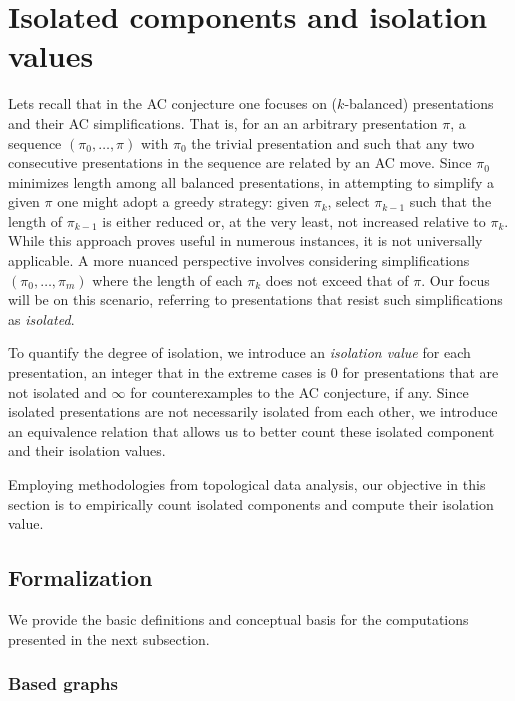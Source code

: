 
\section{Isolated components and isolation values}\label{s:isolation}

Lets recall that in the AC conjecture one focuses on ($k$-balanced) presentations and their AC simplifications.
That is, for an an arbitrary presentation $\pi$, a sequence $(\pi_0,\dots,\pi)$ with $\pi_0$ the trivial presentation and such that any two consecutive presentations in the sequence are related by an AC move.
Since $\pi_0$ minimizes length among all balanced presentations, in attempting to simplify a given $\pi$ one might adopt a greedy strategy: given $\pi_k$, select $\pi_{k-1}$ such that the length of $\pi_{k-1}$ is either reduced or, at the very least, not increased relative to $\pi_k$.
While this approach proves useful in numerous instances, it is not universally applicable.
A more nuanced perspective involves considering simplifications $(\pi_0,\dots,\pi_m)$ where the length of each $\pi_k$ does not exceed that of $\pi$.
Our focus will be on this scenario, referring to presentations that resist such simplifications as \textit{isolated}.

To quantify the degree of isolation, we introduce an \textit{isolation value} for each presentation,
an integer that in the extreme cases is $0$ for presentations that are not isolated and $\infty$ for counterexamples to the AC conjecture, if any.
Since isolated presentations are not necessarily isolated from each other, we introduce an equivalence relation that allows us to better count these isolated component and their isolation values.

Employing methodologies from topological data analysis, our objective in this section is to empirically count isolated components and compute their isolation value.

\subsection{Formalization}

We provide the basic definitions and conceptual basis for the computations presented in the next subsection.

\subsubsection{Based graphs}

